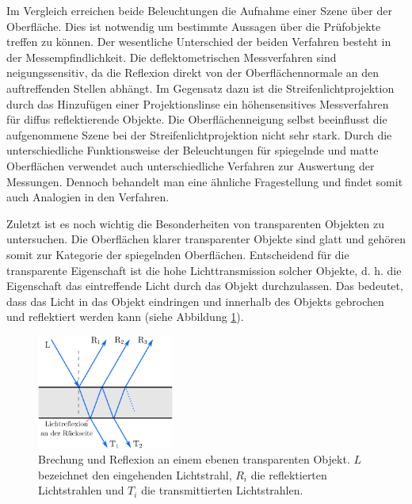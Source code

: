 \noindent
Im Vergleich erreichen beide Beleuchtungen die Aufnahme einer Szene über der Oberfläche.
Dies ist notwendig um bestimmte Aussagen über die Prüfobjekte treffen zu können.
Der wesentliche Unterschied der beiden Verfahren besteht in der Messempfindlichkeit.
Die deflektometrischen Messverfahren sind neigungssensitiv, da die Reflexion direkt von der Oberflächennormale an den auftreffenden Stellen abhängt.
Im Gegensatz dazu ist die Streifenlichtprojektion durch das Hinzufügen einer Projektionslinse ein höhensensitives Messverfahren für diffus reflektierende Objekte.
Die Oberflächenneigung selbst beeinflusst die aufgenommene Szene bei der Streifenlichtprojektion nicht sehr stark.
Durch die unterschiedliche Funktionsweise der Beleuchtungen für spiegelnde und matte Oberflächen verwendet auch unterschiedliche Verfahren zur Auswertung der Messungen.
Dennoch behandelt man eine ähnliche Fragestellung und findet somit auch Analogien in den Verfahren.

\p
Zuletzt ist es noch wichtig die Besonderheiten von transparenten Objekten zu untersuchen.
Die Oberflächen klarer transparenter Objekte sind glatt und gehören somit zur Kategorie der spiegelnden Oberflächen.
Entscheidend für die transparente Eigenschaft ist die hohe Lichttransmission solcher Objekte, d. h. die Eigenschaft das eintreffende Licht durch das Objekt durchzulassen.
Das bedeutet, dass das Licht in das Objekt eindringen und innerhalb des Objekts gebrochen und reflektiert werden kann (siehe Abbildung \ref{img:rueckseitenreflex}).

\begin{figure}[H]
	\centering
	\includegraphics[width=0.4\textwidth]{02_grundlagenDerDeflektometrie/spiegelndeOberflaechen/figures/rueckseitenreflex}
	\caption[Rückseitenreflex]{Brechung und Reflexion an einem ebenen transparenten Objekt. $L$ bezeichnet den eingehenden Lichtstrahl, $R_i$ die reflektierten Lichtstrahlen und $T_i$ die transmittierten Lichtstrahlen. \cite{deflektometrieScheiben}}
	\label{img:rueckseitenreflex}
\end{figure}

